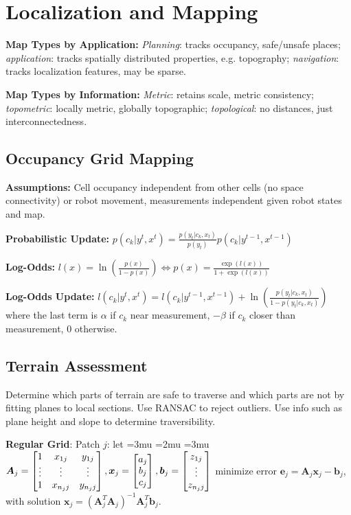 \documentclass[twocolumn, 8pt]{extarticle}
\newenvironment{tight}
  {\begingroup
   \setlength{\arraycolsep}{2pt}
   \thinmuskip=3mu       %
   \medmuskip=2mu        %
   \thickmuskip=3mu      %
  }
  {
    \endgroup
  }
\newcommand{\newvdots}{\vphantom{\int\limits^x}\smash[t]{\vdots}}
\begin{document}
\section{Localization and Mapping} %

\textbf{Map Types by Application:} \emph{Planning}: tracks occupancy, safe/unsafe places; \emph{application}: tracks
spatially distributed properties, e.g. topography; \emph{navigation}: tracks localization features, may be sparse.

\textbf{Map Types by Information:} \emph{Metric}: retains scale, metric consistency; \emph{topometric}: locally metric,
globally topographic; \emph{topological}: no distances, just interconnectedness.

\subsection{Occupancy Grid Mapping}

\textbf{Assumptions:} Cell occupancy independent from other cells (no space connectivity) or robot movement,
measurements independent given robot states and map.

\textbf{Probabilistic Update:} \(\displaystyle p(c_k | y^t, x^t) = \frac{p(y_t | c_k, x_t)}{p(y_t)}p(c_k | y^{t - 1}, x^{t - 1})\)

\textbf{Log-Odds:} \(\displaystyle l(x) = \ln\left(\frac{p(x)}{1 - p(x)}\right) \iff p(x) = \frac{\exp(l(x))}{1 + \exp(l(x))}\)

\textbf{Log-Odds Update:} \(\displaystyle l(c_k | y^t, x^t) = l(c_k | y^{t - 1}, x^{t - 1}) + \ln\left(\frac{p(y_t | c_k, x_t)}{1 - p(y_t | c_k, x_t)}\right)\)
where the last term is \(\alpha\) if \(c_k\) near measurement, \(-\beta\) if \(c_k\) closer than measurement, 0 otherwise.

\subsection{Terrain Assessment}

Determine which parts of terrain are safe to traverse and which parts are not by fitting planes to local sections.
Use RANSAC to reject outliers. Use info such as plane height and slope to determine traversibility.

\textbf{Regular Grid}: Patch $j$: let \begin{tight}\(\bm A_j = \matthree{1}{x_{1j}}{y_{1j}}{\newvdots}{\newvdots}{\newvdots}{1}{x_{n_jj}}{y_{n_jj}}, \bm x_j = \cvec{a_j}{b_j}{c_j}, \bm b_j = \cvec{z_{1j}}{\newvdots}{z_{n_jj}}\)\end{tight}
minimize error $\bm e_j = \bm A_j\bm x_j - \bm b_j$, with solution $\bm x_j = (\bm A_j^T\bm A_j)^{-1}\bm A_j^T\bm b_j$.
\end{document}
